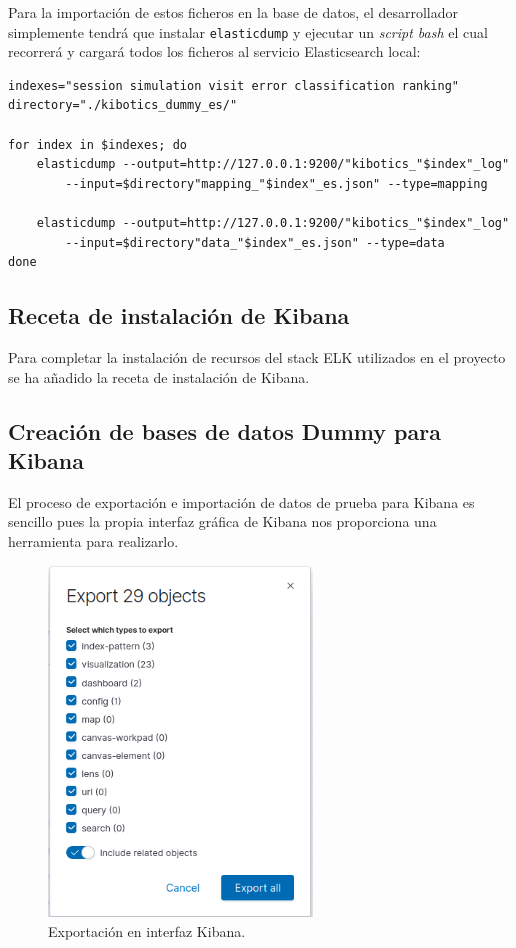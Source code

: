 \documentclass[11pt,a4paper]{book}
\begin{document}
				Para la importación de estos ficheros en la base de datos, el desarrollador simplemente tendrá que instalar \texttt{elasticdump} y ejecutar un \textit{script bash} el cual recorrerá y cargará todos los ficheros al servicio Elasticsearch local:
				
				\begin{Verbatim}[tabsize=4]
indexes="session simulation visit error classification ranking"
directory="./kibotics_dummy_es/"

for index in $indexes; do
	elasticdump --output=http://127.0.0.1:9200/"kibotics_"$index"_log" 
		--input=$directory"mapping_"$index"_es.json" --type=mapping

	elasticdump --output=http://127.0.0.1:9200/"kibotics_"$index"_log" 
		--input=$directory"data_"$index"_es.json" --type=data
done
				\end{Verbatim}
			\subsection{Receta de instalación de Kibana}
			Para completar la instalación de recursos del stack ELK utilizados en el proyecto se ha añadido la receta de instalación de Kibana.\\
						
			\subsection{Creación de bases de datos Dummy para Kibana}
			El proceso de exportación e importación de datos de prueba para Kibana es sencillo pues la propia interfaz gráfica de Kibana nos proporciona una herramienta para realizarlo.
			
			\begin{figure}[H]
				\centering
				\includegraphics[width=7cm, keepaspectratio]{img/export_kibana.png}
				\caption{Exportación en interfaz Kibana.}
				\label{fig:export_kibana}
			\end{figure}
		
\end{document}
